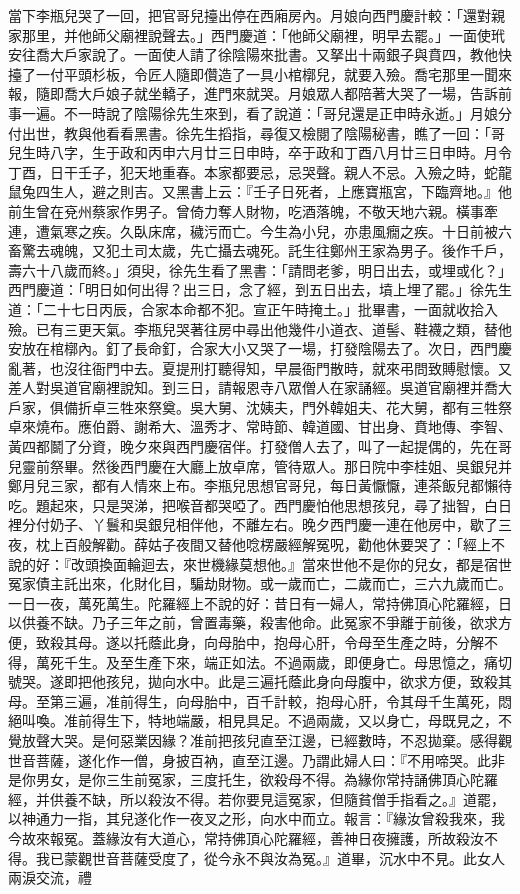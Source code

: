 當下李瓶兒哭了一回，把官哥兒擡出停在西廂房內。月娘向西門慶計較：「還對親家那里，并他師父廟裡說聲去。」西門慶道：「他師父廟裡，明早去罷。」一面使玳安往喬大戶家說了。一面使人請了徐陰陽來批書。又拏出十兩銀子與賁四，教他快擡了一付平頭杉板，令匠人隨即儹造了一具小棺槨兒，就要入殮。喬宅那里一聞來報，隨即喬大戶娘子就坐轎子，進門來就哭。月娘眾人都陪著大哭了一場，告訴前事一遍。不一時說了陰陽徐先生來到，看了說道：「哥兒還是正申時永逝。」月娘分付出世，教與他看看黑書。徐先生搯指，尋復又檢閱了陰陽秘書，瞧了一回：「哥兒生時八字，生于政和丙申六月廿三日申時，卒于政和丁酉八月廿三日申時。月令丁酉，日干壬子，犯天地重春。本家都要忌，忌哭聲。親人不忌。入殮之時，蛇龍鼠兔四生人，避之則吉。又黑書上云：『壬子日死者，上應寶瓶宮，下臨齊地。』他前生曾在兗州蔡家作男子。曾倚力奪人財物，吃酒落魄，不敬天地六親。橫事牽連，遭氣寒之疾。久臥床席，穢污而亡。今生為小兒，亦患風癇之疾。十日前被六畜驚去魂魄，又犯土司太歲，先亡攝去魂死。託生往鄭州王家為男子。後作千戶，壽六十八歲而終。」須臾，徐先生看了黑書：「請問老爹，明日出去，或埋或化？」西門慶道：「明日如何出得？出三日，念了經，到五日出去，墳上埋了罷。」徐先生道：「二十七日丙辰，合家本命都不犯。宣正午時掩土。」批畢書，一面就收拾入殮。已有三更天氣。李瓶兒哭著往房中尋出他幾件小道衣、道髻、鞋襪之類，替他安放在棺槨內。釘了長命釘，合家大小又哭了一場，打發陰陽去了。次日，西門慶亂著，也沒往衙門中去。夏提刑打聽得知，早晨衙門散時，就來弔問致賻慰懷。又差人對吳道官廟裡說知。到三日，請報恩寺八眾僧人在家誦經。吳道官廟裡并喬大戶家，俱備折卓三牲來祭奠。吳大舅、沈姨夫，門外韓姐夫、花大舅，都有三牲祭卓來燒布。應伯爵、謝希大、溫秀才、常時節、韓道國、甘出身、賁地傳、李智、黃四都鬬了分資，晚夕來與西門慶宿伴。打發僧人去了，叫了一起提偶的，先在哥兒靈前祭畢。然後西門慶在大廳上放卓席，管待眾人。那日院中李桂姐、吳銀兒并鄭月兒三家，都有人情來上布。李瓶兒思想官哥兒，每日黃懨懨，連茶飯兒都懶待吃。題起來，只是哭涕，把喉音都哭啞了。西門慶怕他思想孩兒，尋了拙智，白日裡分付奶子、丫鬟和吳銀兒相伴他，不離左右。晚夕西門慶一連在他房中，歇了三夜，枕上百般解勸。薛姑子夜間又替他唸楞嚴經解冤呪，勸他休要哭了：「經上不說的好：『改頭換面輪迴去，來世機緣莫想他。』當來世他不是你的兒女，都是宿世冤家債主託出來，化財化目，騙劫財物。或一歲而亡，二歲而亡，三六九歲而亡。一日一夜，萬死萬生。陀羅經上不說的好：昔日有一婦人，常持佛頂心陀羅經，日以供養不缺。乃子三年之前，曾置毒藥，殺害他命。此冤家不爭離于前後，欲求方便，致殺其母。遂以托蔭此身，向母胎中，抱母心肝，令母至生產之時，分解不得，萬死千生。及至生產下來，端正如法。不過兩歲，即便身亡。母思憶之，痛切號哭。遂即把他孩兒，拋向水中。此是三遍托蔭此身向母腹中，欲求方便，致殺其母。至第三遍，准前得生，向母胎中，百千計較，抱母心肝，令其母千生萬死，悶絕叫喚。准前得生下，特地端嚴，相見具足。不過兩歲，又以身亡，母既見之，不覺放聲大哭。是何惡業因緣？准前把孩兒直至江邊，已經數時，不忍拋棄。感得觀世音菩薩，遂化作一僧，身披百衲，直至江邊。乃謂此婦人曰：『不用啼哭。此非是你男女，是你三生前冤家，三度托生，欲殺母不得。為緣你常持誦佛頂心陀羅經，并供養不缺，所以殺汝不得。若你要見這冤家，但隨貧僧手指看之。』道罷，以神通力一指，其兒遂化作一夜叉之形，向水中而立。報言：『緣汝曾殺我來，我今故來報冤。蓋緣汝有大道心，常持佛頂心陀羅經，善神日夜擁護，所故殺汝不得。我已蒙觀世音菩薩受度了，從今永不與汝為冤。』道畢，沉水中不見。此女人兩淚交流，禮